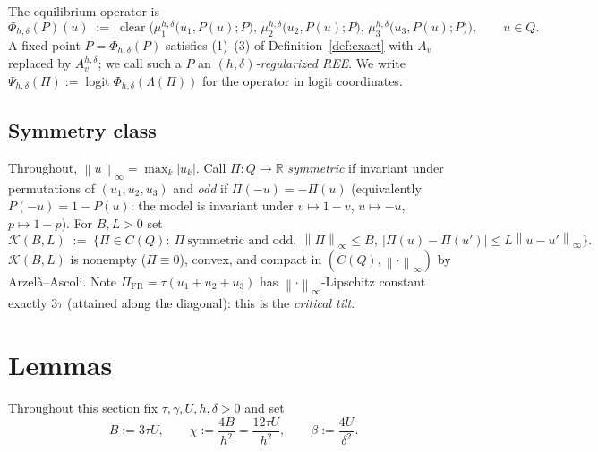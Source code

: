 \documentclass[11pt]{article}
\theoremstyle{definition}
\newcommand{\R}{\mathbb{R}}
\newcommand{\Lam}{\Lambda}
\newcommand{\clear}{\operatorname{clear}}
\newcommand{\norm}[1]{\left\lVert #1 \right\rVert}
\newcommand{\Kc}{\mathcal{K}}
\begin{document}
The equilibrium operator is
\begin{equation}\label{eq:Phi}
\Phi_{h,\delta}(P)(u)\;:=\;
\clear\Big(\mu^{h,\delta}_1\big(u_1,P(u);P\big),\,
\mu^{h,\delta}_2\big(u_2,P(u);P\big),\,
\mu^{h,\delta}_3\big(u_3,P(u);P\big)\Big),
\qquad u\in Q .
\end{equation}
A fixed point $P=\Phi_{h,\delta}(P)$ satisfies (1)--(3) of
Definition~\ref{def:exact} with $A_v$ replaced by $A^{h,\delta}_v$; we call
such a $P$ an \emph{$(h,\delta)$-regularized REE}. We write
$\Psi_{h,\delta}(\Pi):=\operatorname{logit}\Phi_{h,\delta}(\Lam(\Pi))$ for
the operator in logit coordinates.

\subsection{Symmetry class}
Throughout, $\norm{u}_\infty=\max_k|u_k|$. Call $\Pi:Q\to\R$
\emph{symmetric} if invariant under permutations of $(u_1,u_2,u_3)$ and
\emph{odd} if $\Pi(-u)=-\Pi(u)$ (equivalently $P(-u)=1-P(u)$: the model is
invariant under $v\mapsto 1-v$, $u\mapsto-u$, $p\mapsto1-p$). For $B,L>0$ set
\begin{equation}\label{eq:K}
\Kc(B,L)\;:=\;\Big\{\Pi\in C(Q):\ \Pi\ \text{symmetric and odd},\
\norm{\Pi}_\infty\le B,\
|\Pi(u)-\Pi(u')|\le L\norm{u-u'}_\infty\Big\}.
\end{equation}
$\Kc(B,L)$ is nonempty ($\Pi\equiv0$), convex, and compact in
$(C(Q),\norm{\cdot}_\infty)$ by Arzel\`a--Ascoli. Note
$\Pi_{\mathrm{FR}}=\tau(u_1+u_2+u_3)$ has $\norm{\cdot}_\infty$-Lipschitz
constant exactly $3\tau$ (attained along the diagonal): this is the
\emph{critical tilt}.

\section{Lemmas}\label{sec:lemmas}

Throughout this section fix $\tau,\gamma,U,h,\delta>0$ and set
\begin{equation}\label{eq:constants}
B:=3\tau U,\qquad
\chi:=\frac{4B}{h^2}=\frac{12\tau U}{h^2},\qquad
\beta:=\frac{4U}{\delta^2}.
\end{equation}
\end{document}
